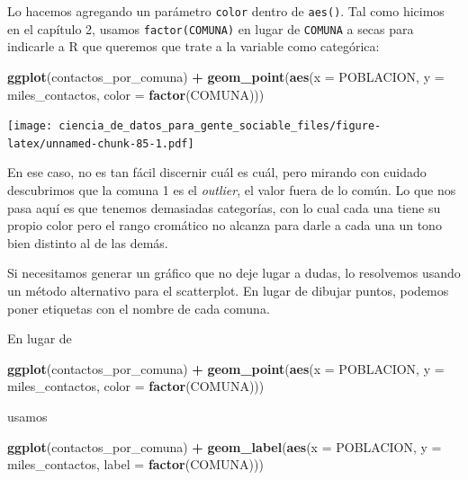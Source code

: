 \documentclass[]{book}
\newenvironment{Shaded}{\begin{snugshade}}{\end{snugshade}}
\newcommand{\KeywordTok}[1]{\textcolor[rgb]{0.13,0.29,0.53}{\textbf{#1}}}
\newcommand{\DataTypeTok}[1]{\textcolor[rgb]{0.13,0.29,0.53}{#1}}
\newcommand{\StringTok}[1]{\textcolor[rgb]{0.31,0.60,0.02}{#1}}
\newcommand{\OperatorTok}[1]{\textcolor[rgb]{0.81,0.36,0.00}{\textbf{#1}}}
\newcommand{\NormalTok}[1]{#1}
\begin{document}
Lo hacemos agregando un parámetro \texttt{color} dentro de
\texttt{aes()}. Tal como hicimos en el capítulo 2, usamos
\texttt{factor(COMUNA)} en lugar de \texttt{COMUNA} a secas para
indicarle a R que queremos que trate a la variable como categórica:

\begin{Shaded}
\begin{Highlighting}[]
\KeywordTok{ggplot}\NormalTok{(contactos_por_comuna) }\OperatorTok{+}\StringTok{ }
\StringTok{    }\KeywordTok{geom_point}\NormalTok{(}\KeywordTok{aes}\NormalTok{(}\DataTypeTok{x =}\NormalTok{ POBLACION, }\DataTypeTok{y =}\NormalTok{ miles_contactos, }\DataTypeTok{color =} \KeywordTok{factor}\NormalTok{(COMUNA)))}
\end{Highlighting}
\end{Shaded}

\texttt{[image: ciencia\_de\_datos\_para\_gente\_sociable\_files/figure-latex/unnamed-chunk-85-1.pdf]}

En ese caso, no es tan fácil discernir cuál es cuál, pero mirando con
cuidado descubrimos que la comuna 1 es el \emph{outlier}, el valor fuera
de lo común. Lo que nos pasa aquí es que tenemos demasiadas categorías,
con lo cual cada una tiene su propio color pero el rango cromático no
alcanza para darle a cada una un tono bien distinto al de las demás.

Si necesitamos generar un gráfico que no deje lugar a dudas, lo
resolvemos usando un método alternativo para el scatterplot. En lugar de
dibujar puntos, podemos poner etiquetas con el nombre de cada comuna.

En lugar de

\begin{Shaded}
\begin{Highlighting}[]
\KeywordTok{ggplot}\NormalTok{(contactos_por_comuna) }\OperatorTok{+}\StringTok{ }
\StringTok{    }\KeywordTok{geom_point}\NormalTok{(}\KeywordTok{aes}\NormalTok{(}\DataTypeTok{x =}\NormalTok{ POBLACION, }\DataTypeTok{y =}\NormalTok{ miles_contactos, }\DataTypeTok{color =} \KeywordTok{factor}\NormalTok{(COMUNA)))}
\end{Highlighting}
\end{Shaded}

usamos

\begin{Shaded}
\begin{Highlighting}[]
\KeywordTok{ggplot}\NormalTok{(contactos_por_comuna) }\OperatorTok{+}
\StringTok{    }\KeywordTok{geom_label}\NormalTok{(}\KeywordTok{aes}\NormalTok{(}\DataTypeTok{x =}\NormalTok{ POBLACION, }\DataTypeTok{y =}\NormalTok{ miles_contactos, }\DataTypeTok{label =} \KeywordTok{factor}\NormalTok{(COMUNA)))}
\end{Highlighting}
\end{Shaded}
\end{document}
